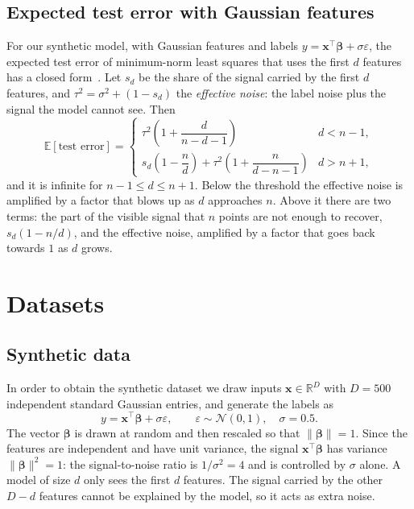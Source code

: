 \documentclass[11pt,a4paper]{article}
\begin{document}
\subsection{Expected test error with Gaussian features}
For our synthetic model, with Gaussian features and labels
$y = \mathbf{x}^\top \boldsymbol{\beta} + \sigma \varepsilon$, the expected
test error of minimum-norm least squares that uses the first $d$ features
has a closed form~\cite{belkin2020two}. Let $s_d$ be the share of the signal
carried by the first $d$ features, and $\tau^2 = \sigma^2 + (1 - s_d)$ the
\emph{effective noise}: the label noise plus the signal the model cannot
see. Then
\begin{equation}
  \mathbb{E}[\text{test error}] =
  \begin{cases}
    \tau^2 \left(1 + \dfrac{d}{n - d - 1}\right) & d < n - 1, \\[10pt]
    s_d \left(1 - \dfrac{n}{d}\right)
      + \tau^2 \left(1 + \dfrac{n}{d - n - 1}\right) & d > n + 1,
  \end{cases}
  \label{eq:theory}
\end{equation}
and it is infinite for $n - 1 \le d \le n + 1$. Below the threshold the
effective noise is amplified by a factor that blows up as $d$ approaches
$n$. Above it there are two terms: the part of the visible signal that $n$
points are not enough to recover, $s_d (1 - n/d)$, and the effective noise,
amplified by a factor that goes back towards $1$ as $d$ grows.

\section{Datasets}

\subsection{Synthetic data}
In order to obtain the synthetic dataset we draw inputs
$\mathbf{x} \in \mathbb{R}^D$ with $D = 500$ independent standard Gaussian
entries, and generate the labels as
\begin{equation}
  y = \mathbf{x}^\top \boldsymbol{\beta} + \sigma \varepsilon, \qquad
  \varepsilon \sim \mathcal{N}(0, 1), \quad \sigma = 0.5 .
\end{equation}
The vector $\boldsymbol{\beta}$ is drawn at random and then rescaled so that
$\|\boldsymbol{\beta}\| = 1$. Since the features are independent and have
unit variance, the signal $\mathbf{x}^\top \boldsymbol{\beta}$ has variance
$\|\boldsymbol{\beta}\|^2 = 1$: the signal-to-noise ratio is $1/\sigma^2 = 4$
and is controlled by $\sigma$ alone. A model of size $d$ only sees the first
$d$ features. The signal carried by the other $D - d$ features cannot be
explained by the model, so it acts as extra noise.
\end{document}
